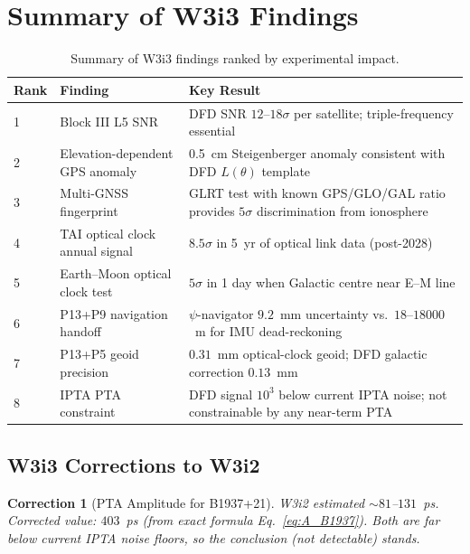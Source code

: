 \documentclass[aps,prd,twocolumn,superscriptaddress,nofootinbib]{revtex4-2}
\newtheorem{correction}{Correction}
\begin{document}
\section{Summary of W3i3 Findings}

\begin{table}[h]
\caption{Summary of W3i3 findings ranked by experimental impact.}
\label{tab:w3i3_summary}
\begin{ruledtabular}
\begin{tabular}{llp{5cm}}
Rank & Finding & Key Result \\
\hline
1 & Block III L5 SNR & DFD SNR $12$--$18\sigma$ per satellite;
    triple-frequency essential \\
2 & Elevation-dependent GPS anomaly & 0.5~cm Steigenberger anomaly
    consistent with DFD $L(\theta)$ template \\
3 & Multi-GNSS fingerprint & GLRT test with known GPS/GLO/GAL ratio
    provides $5\sigma$ discrimination from ionosphere \\
4 & TAI optical clock annual signal & $8.5\sigma$ in 5~yr of optical
    link data (post-2028) \\
5 & Earth--Moon optical clock test & $5\sigma$ in 1 day when Galactic
    centre near E--M line \\
6 & P13+P9 navigation handoff & $\psi$-navigator $9.2$~mm uncertainty
    vs.\ $18$--$18000$~m for IMU dead-reckoning \\
7 & P13+P5 geoid precision & $0.31$~mm optical-clock geoid;
    DFD galactic correction $0.13$~mm \\
8 & IPTA PTA constraint & DFD signal $10^3$ below current IPTA noise;
    not constrainable by any near-term PTA \\
\end{tabular}
\end{ruledtabular}
\end{table}

\subsection{W3i3 Corrections to W3i2}

\begin{correction}[PTA Amplitude for B1937+21]
W3i2 estimated $\sim 81$--$131$~ps. Corrected value: $403$~ps
(from exact formula Eq.~\ref{eq:A_B1937}). Both are far below
current IPTA noise floors, so the conclusion (not detectable) stands.
\end{correction}
\end{document}
